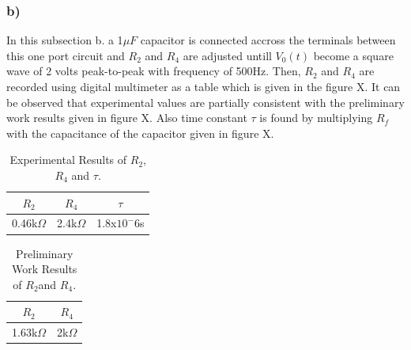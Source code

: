 \documentclass[letterpaper,12pt]{article}
\begin{document}
\subsubsection{b)}
In this subsection b. a 1\(\mu F\) capacitor is connected accross the terminals between this one port circuit and \(R_2 \) and \(R_4 \) are adjusted untill \(V_0(t)\) become a square wave of 2 volts peak-to-peak with frequency of 500Hz. Then, \(R_2 \) and \(R_4 \) are recorded using digital multimeter as a table which is given in the figure X. It can be observed that experimental values are partially consistent with the preliminary work results given in figure X. Also time constant \(\tau\) is found by multiplying \(R_f\) with the capacitance of the capacitor given in figure X. 
\begin{table}[H]
    \begin{center}
        \caption{Experimental Results of \(R_2\),\(R_4\) and \(\tau \).}
        \vspace{2mm}
        \begin{tabular}{||c | c | c ||} 
            \hline
            \(R_2\) & \(R_4\) &  \(\tau \) \\ [0.5ex] 
            \hline\hline
            0.46k\(\Omega\) & 2.4k\(\Omega\) &  1.8x\(10^-6\)s \\
            \hline
        \end{tabular}
    \end{center}
\end{table}

\begin{table}[H]
    \begin{center}
        \caption{Preliminary Work Results of \(R_2\)and \(R_4\).}
        \vspace{2mm}
        \begin{tabular}{||c | c ||} 
            \hline
            \(R_2\) & \(R_4\) \\ [0.5ex] 
            \hline\hline
            1.63k\(\Omega\) & 2k\(\Omega\)   \\
            \hline
        \end{tabular}
    \end{center}
\end{table}
\end{document}
